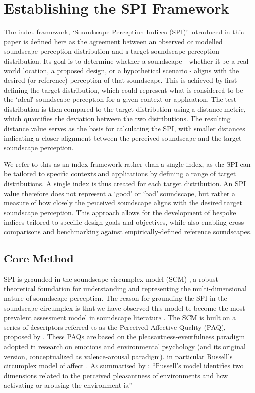 \documentclass[
  authoryear,
  preprint,
  3p]{elsarticle}
\begin{document}
\section{Establishing the SPI Framework}\label{sec-method}

The index framework, `Soundscape Perception Indices (SPI)' introduced in
this paper is defined here as the agreement between an observed or
modelled soundscape perception distribution and a target soundscape
perception distribution. Its goal is to determine whether a soundscape -
whether it be a real-world location, a proposed design, or a
hypothetical scenario - aligns with the desired (or reference)
perception of that soundscape. This is achieved by first defining the
target distribution, which could represent what is considered to be the
`ideal' soundscape perception for a given context or application. The
test distribution is then compared to the target distribution using a
distance metric, which quantifies the deviation between the two
distributions. The resulting distance value serves as the basis for
calculating the SPI, with smaller distances indicating a closer
alignment between the perceived soundscape and the target soundscape
perception.

We refer to this as an index framework rather than a single index, as
the SPI can be tailored to specific contexts and applications by
defining a range of target distributions. A single index is thus created
for each target distribution. An SPI value therefore does not represent
a `good' or `bad' soundscape, but rather a measure of how closely the
perceived soundscape aligns with the desired target soundscape
perception. This approach allows for the development of bespoke indices
tailored to specific design goals and objectives, while also enabling
cross-comparisons and benchmarking against empirically-defined reference
soundscapes.

\subsection{Core Method}\label{core-method}

SPI is grounded in the soundscape circumplex model (SCM)
\citep{Axelsson2010principal, Axelsson2012Swedish}, a robust theoretical
foundation for understanding and representing the multi-dimensional
nature of soundscape perception. The reason for grounding the SPI in the
soundscape circumplex is that we have observed this model to become the
most prevalent assessment model in soundscape literature
\citep{Aletta2023Adoption}. The SCM is built on a series of descriptors
referred to as the Perceived Affective Quality (PAQ), proposed by
\citep{Axelsson2010principal}. These PAQs are based on the
pleasantness-eventfulness paradigm adopted in research on emotions and
environmental psychology (and its original version, conceptualized as
valence-arousal paradigm), in particular Russell's circumplex model of
affect \citep{Russell1980circumplex}. As summarised by
\citet{Axelsson2010principal}: ``Russell's model identifies two
dimensions related to the perceived pleasantness of environments and how
activating or arousing the environment is.''
\end{document}
